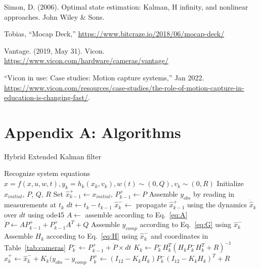\documentclass[letterpaper, paper,11pt]{AAS}	%
\begin{document}
\begin{thebibliography}{10}
Simon, D. (2006). Optimal state estimation: Kalman, H infinity, and nonlinear approaches. John Wiley \& Sons.

Tobias, ``Mocap Deck,'' \url{https://www.bitcraze.io/2018/06/mocap-deck/}

  Vantage. (2019, May 31). Vicon. \url{https://www.vicon.com/hardware/cameras/vantage/}

``Vicon in use: Case studies: Motion capture systems,''  Jan 2022. \url{https://www.vicon.com/resources/case-studies/the-role-of-motion-capture-in-education-is-changing-fast/}.

\end{thebibliography}


\pagebreak
\appendix
\section*{Appendix A: Algorithms}
\begin{algorithm}[H]
\footnotesize
\caption{Hybrid Extended Kalman filter\cite{Simon}}
\label{alg:EKF}
\begin{algorithmic}[1]
\State Recognize system equations $\hat{x}=f(x,u,w,t), y_k=h_k(x_k,v_k), w(t)\sim(0,Q), v_k\sim(0,R)$
\State Initialize $x_{initial}$, $P$, $Q$, $R$
\State Set $\hat{x}_{k-1}^+ \gets x_{initial}$, $P_{k-1}^+ \gets P$
    \State Assemble $y_{obs}$ by reading in measurements at $t_k$
    \State $dt \gets t_k - t_{k-1}$
    \State $\hat{x}_k^- \gets$ propagate $\hat{x}_{k-1}^+$ using the dynamics $\dot{\hat{x}}_k$ over $dt$ using ode45
    \State $A \gets$ assemble according to Eq.~\ref{eq:A}
    \State $\dot{P} \gets AP_{k-1}^+ + P_{k-1}^+A^T + Q$
    \State Assemble $y_{comp}$ according to Eq.~\ref{eq:G} using $\hat{x}_k^-$
    \State Assemble $H_k$ according to Eq.~\ref{eq:H} using $\hat{x}_k^-$ and coordinates in Table~\ref{tab:cameras}
    \State $P_k^- \gets P_{k-1}^+ + \dot{P}\times dt$
    \State $K_k \gets P_k^- H_k^T(H_kP_k^-H_k^T+R)^{-1}$
    \State $\hat{x}_k^+ \gets \hat{x}_k^- + K_k(y_{obs}-y_{comp}$
    \State $P_k^+\gets (I_{12}-K_kH_k)P_k^-(I_{12}-K_kH_k)^T + R$
\EndFor
\end{algorithmic}
\end{algorithm}
\end{document}

